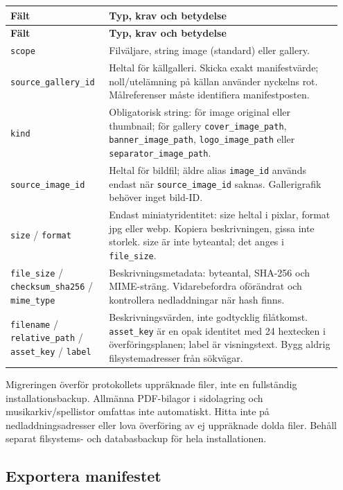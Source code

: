 \documentclass[11pt,a4paper]{article}
\newcommand{\codeword}[1]{\nolinkurl{#1}}
\begin{document}
\begin{longtable}{@{}>{\RaggedRight\arraybackslash}p{0.28\linewidth}>{\RaggedRight\arraybackslash}p{0.67\linewidth}@{}}
\toprule
\textbf{Fält} & \textbf{Typ, krav och betydelse} \\
\midrule
\endfirsthead
\toprule
\textbf{Fält} & \textbf{Typ, krav och betydelse} \\
\midrule
\endhead
\bottomrule
\endfoot
\codeword{scope} & Filväljare, string image (standard) eller gallery. \\
\codeword{source_gallery_id} & Heltal för källgalleri. Skicka exakt manifestvärde;
noll/utelämning på källan använder nyckelns rot. Målreferenser måste identifiera
manifestposten. \\
\codeword{kind} & Obligatorisk string: för image original eller thumbnail; för gallery
\codeword{cover_image_path}, \codeword{banner_image_path}, \codeword{logo_image_path} eller
\codeword{separator_image_path}. \\
\codeword{source_image_id} & Heltal för bildfil; äldre alias \codeword{image_id} används
endast när \codeword{source_image_id} saknas. Gallerigrafik behöver inget bild-ID. \\
\codeword{size} / \codeword{format} & Endast miniatyridentitet: size heltal i pixlar, format
jpg eller webp. Kopiera beskrivningen, gissa inte storlek. size är inte byteantal; det anges
i \codeword{file_size}. \\
\codeword{file_size} / \codeword{checksum_sha256} / \codeword{mime_type} &
Beskrivningsmetadata: byteantal, SHA-256 och MIME-sträng. Vidarebefordra oförändrat och
kontrollera nedladdningar när hash finns. \\
\codeword{filename} / \codeword{relative_path} / \codeword{asset_key} / \codeword{label} &
Beskrivningsvärden, inte godtycklig filåtkomst. \codeword{asset_key} är en opak identitet
med 24 hextecken i överföringsplanen; label är visningstext. Bygg aldrig filsystemadresser
från sökvägar. \\
\end{longtable}

Migreringen överför protokollets uppräknade filer, inte en fullständig installationsbackup.
Allmänna PDF-bilagor i sidolagring och musikarkiv/spellistor omfattas inte automatiskt.
Hitta inte på nedladdningsadresser eller lova överföring av ej uppräknade dolda filer.
Behåll separat filsystems- och databasbackup för hela installationen.

\subsection{\texorpdfstring{Exportera manifestet}{Exportera manifestet}}
\end{document}
